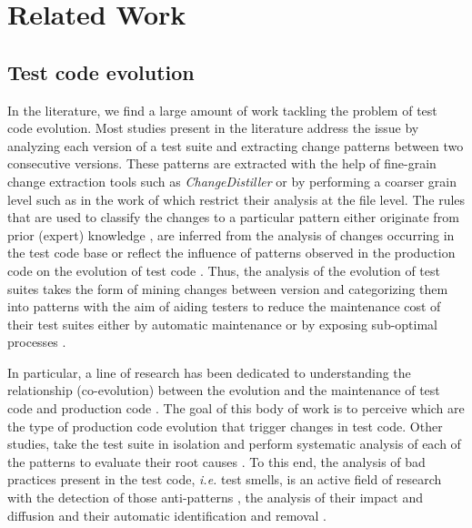 \chapter{Related Work}
\label{chap:related-work}

\section{Test code evolution}
\label{sec:related-evolution}

In the literature, we find a large amount of work tackling the problem of test code evolution. Most studies present in the literature address the issue by analyzing each version of a test suite and extracting change patterns between two consecutive versions. These patterns are extracted with the help of fine-grain change extraction tools such as \emph{ChangeDistiller} \cite{Fluri2007} or by performing  a coarser grain level such as in the work of \textcite{Zaidman2011} which restrict their analysis at the file level. The rules that are used to classify the changes to a particular pattern either originate from prior (expert) knowledge \cite{Marsavina2014}, are inferred from the analysis of changes occurring in the test code base \cite{Negara2014, Labuschagne2017} or reflect the influence of patterns observed in the production code on the evolution of test code \cite{VanRompaey2008}. Thus, the analysis of the evolution of test suites takes the form of mining changes between version and categorizing them into patterns with the aim of aiding testers to reduce the maintenance cost of their test suites either by automatic maintenance \cite{Hurdugaci2012} or by exposing sub-optimal processes \cite{Labuschagne2017}.

In particular, a line of research has been dedicated to understanding the relationship (co-evolution) between the evolution and the maintenance of test code and production code \cite{Lamkanfi2010, Zaidman2011, Marsavina2014, Levin2017, Vidacs2018, Alenezi2019}. The goal of this body of work is to perceive which are the type of production code evolution that trigger changes in test code. Other studies, take the test suite in isolation and perform systematic analysis of each of the patterns to evaluate their root causes \cite{Pinto2012}. To this end, the analysis of bad practices present in the test code, \emph{i.e.} test smells, is an active field of research with the detection of those anti-patterns \cite{VanDeursen2001, Bowes2017, Tufano2016}, the analysis of their impact and diffusion \cite{Bavota2015, Tufano2016, Kim2020} and their automatic identification and removal \cite{VanRompaey2007, Reichhart2007, Peruma2020}.

